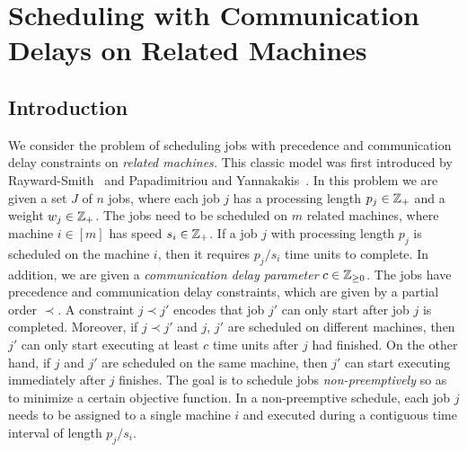 \chapter{Scheduling with Communication Delays on Related Machines}\label{chapter: S2}

  \section{Introduction}
  We consider the problem of scheduling jobs with precedence and communication delay constraints on {\em related machines.}
  This classic model  was first introduced by Rayward-Smith~\cite{RAYWARDSMITH1987} and Papadimitriou and Yannakakis~\cite{PapadimitriouY90}.
  In this problem we are given a set  $J$ of $n$ jobs, where each job $j$ has a processing length $p_j  \in \mathbb{Z}_+$ and a weight $w_j \in \mathbb{Z}_+$.
  The jobs need to be scheduled on $m$ related machines, where machine $i \in [m]$ has speed $s_i  \in \mathbb{Z}_+$.
  If a job $j$ with processing length $p_j$ is scheduled on the machine $i$, then it requires  $p_j/s_i$ time units to complete.
  In addition, we are  given a {\em communication delay parameter} $c \in  \mathbb{Z}_{\ge 0}$.
  The jobs have precedence and communication delay constraints, which are given by a partial order $\prec$. 
  A constraint $j \prec j'$ encodes that job $j'$ can only start after job $j$ is completed.
  Moreover, if $j \prec j'$ and $j$, $j'$ are scheduled on {different machines}, then $j'$ can only start executing at least $c$ time units after $j$ had finished. 
  On the other hand,  if $j$ and $j'$ are scheduled on the {same machine}, then $j'$ can start executing immediately after $j$ finishes. 
  The goal is to schedule jobs {\em non-preemptively} so as to minimize a certain objective function.
  In a non-preemptive schedule, each job $j$ needs to be  assigned to a single machine $i$ and executed during a contiguous time interval of length $p_j/s_i$.
  
